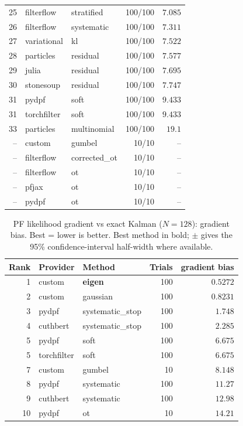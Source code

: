 \begin{table}[!htbp]
\begin{tabular}{rllrr}
25 & filterflow & stratified & 100/100 & $7.085$ \\
26 & filterflow & systematic & 100/100 & $7.311$ \\
27 & variational & kl & 100/100 & $7.522$ \\
28 & particles & residual & 100/100 & $7.577$ \\
29 & julia & residual & 100/100 & $7.695$ \\
30 & stonesoup & residual & 100/100 & $7.747$ \\
31 & pydpf & soft & 100/100 & $9.433$ \\
31 & torchfilter & soft & 100/100 & $9.433$ \\
33 & particles & multinomial & 100/100 & $19.1$ \\
-- & custom & gumbel & 10/10 & $\text{--}$ \\
-- & filterflow & corrected\_ot & 10/10 & $\text{--}$ \\
-- & filterflow & ot & 10/10 & $\text{--}$ \\
-- & pfjax & ot & 10/10 & $\text{--}$ \\
-- & pydpf & ot & 10/10 & $\text{--}$ \\
\bottomrule
\end{tabular}
\end{table}


\begin{table}[!htbp]
\centering
\small
\caption{PF likelihood gradient vs exact Kalman ($N=128$): gradient bias. Best = lower is better. Best method in bold; $\pm$ gives the 95\% confidence-interval half-width where available.}
\label{tab:pf-likelihood-gradient-vs-exact-kalman-gradient-bias}
\begin{tabular}{rllrr}
\toprule
Rank & Provider & Method & Trials & gradient bias \\
\midrule
1 & custom & \textbf{eigen} & 100 & $\mathbf{0.5272}$ \\
2 & custom & gaussian & 100 & $0.8231$ \\
3 & pydpf & systematic\_stop & 100 & $1.748$ \\
4 & cuthbert & systematic\_stop & 100 & $2.285$ \\
5 & pydpf & soft & 100 & $6.675$ \\
5 & torchfilter & soft & 100 & $6.675$ \\
7 & custom & gumbel & 10 & $8.148$ \\
8 & pydpf & systematic & 100 & $11.27$ \\
9 & cuthbert & systematic & 100 & $12.98$ \\
10 & pydpf & ot & 10 & $14.21$ \\
\bottomrule
\end{tabular}
\end{table}

